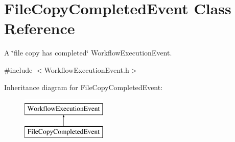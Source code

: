 \hypertarget{class_file_copy_completed_event}{}\section{File\+Copy\+Completed\+Event Class Reference}
\label{class_file_copy_completed_event}


A \char`\"{}file copy has completed\char`\"{} Workflow\+Execution\+Event.  




{\ttfamily \#include $<$Workflow\+Execution\+Event.\+h$>$}

Inheritance diagram for File\+Copy\+Completed\+Event\+:\begin{figure}[H]
\begin{center}
\leavevmode
\includegraphics[height=2.000000cm]{class_file_copy_completed_event}
\end{center}
\end{figure}
